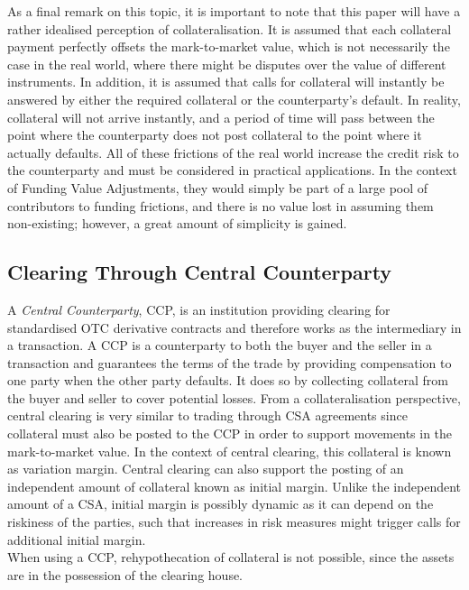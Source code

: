 \documentclass[main.tex]{subfiles}
\begin{document}
        As a final remark on this topic,
        it is important to note that this paper will have a rather idealised perception of collateralisation.
        It is assumed that each collateral payment perfectly offsets the mark-to-market value,
        which is not necessarily the case in the real world,
        where there might be disputes over the value of different instruments.
        In addition, it is assumed that calls for collateral will instantly be answered
        by either the required collateral or the counterparty's default. 
        In reality, collateral will not arrive instantly, and a period of time will pass between
        the point where the counterparty does not post collateral to the point where it actually defaults.
        All of these frictions of the real world increase the credit risk to the counterparty
        and must be considered in practical applications. 
        In the context of Funding Value Adjustments, 
        they would simply be part of a large pool of contributors to funding frictions,
        and there is no value lost in assuming them non-existing;
        however, a great amount of simplicity is gained.

    \subsection{Clearing Through Central Counterparty}
        A \textit{Central Counterparty}, CCP, is an institution
        providing clearing for standardised OTC derivative contracts
        and therefore works as the intermediary in a transaction.
        A CCP is a counterparty to both the buyer and the seller in a transaction 
        and guarantees the terms of the trade by providing compensation to one party when the other party defaults.
        It does so by collecting collateral from the buyer and seller to cover potential losses.
        From a collateralisation perspective, central clearing is very similar to trading through CSA agreements
        since collateral must also be posted to the CCP in order to support movements in the mark-to-market value.
        In the context of central clearing, this collateral is known as variation margin.
        Central clearing can also support the posting of an independent amount of collateral 
        known as initial margin.
        Unlike the independent amount of a CSA, initial margin is possibly dynamic 
        as it can depend on the riskiness of the parties, 
        such that increases in risk measures might trigger calls for additional initial margin.
        \\
        When using a CCP, rehypothecation of collateral is not possible,
        since the assets are in the possession of the clearing house.
\end{document}

